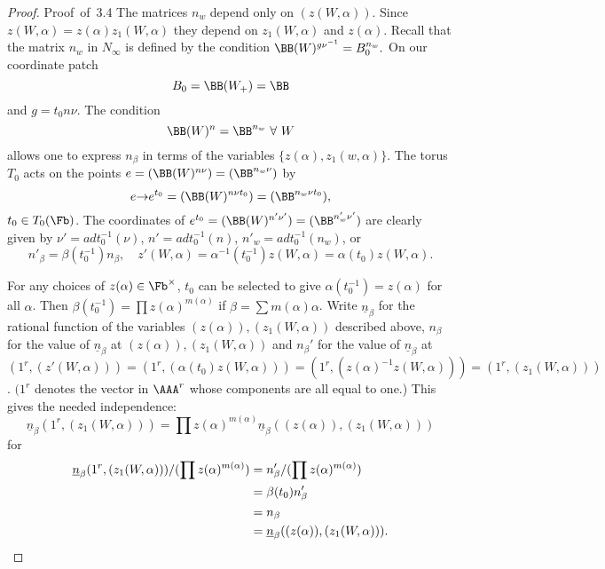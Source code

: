 \documentclass{memo-l}
\theoremstyle{definition}
\theoremstyle{remark}
\numberwithin{section}{chapter}
\numberwithin{equation}{chapter}
\begin{document}
\begin{proof} {Proof\ of\ 3.4}    The matrices $n_{w}$ depend only on $(z(W,{\alpha}))$. 
 Since $z(W,{\alpha}) = z({\alpha})z_{1}(W,{\alpha})$ they depend on 
$z_1(W,{\alpha})$ and $z({\alpha})$. 
 Recall that the matrix $n_{w}$ in $N_{{\infty}}$ is defined by the condition 
${\BB}(W)^{g\nu^{-1}} = B_{0}^{n_w}.$  
On our
coordinate patch $$B_{0} = {\BB}(W_{+})={\BB}$$ and $g = t_{0}n{\nu}$. 
 The condition $${\BB}(W)^n  = 
{\BB}^{n_w} \ \forall \ W$$ allows one to 
express $n_{{\beta}}$ in terms of the variables 
$\{z({\alpha}),z_{1}(w,\alpha)\}$.   The torus $T_{0}$ acts on the points 
$e = ({\BB}(W)^{n\nu}) = 
({\BB}^{n_w\nu})$ by $$e {\to} e^{t_0}  = ({\BB}(W)^{n\nu t_0}) = 
({\BB}^{n_w\nu t_0}),$$ $t_{0} \in T_{0}(\Fb)$. 
The coordinates of $e^{t_0}  = ({\BB}(W)^{n'{\nu}'}) = 
({\BB}^{n_{w}'{\nu}'})$ are clearly given by ${\nu}' = 
adt_0^{-1}({\nu})$, $n' = adt_0^{-1}(n)$, $n'_{w} = 
adt_0^{-1}(n_{w})$, or $$n'_{{\beta}} = {\beta}(t_0^{-1})n_{{\beta}},\quad 
z'(W,{\alpha}) = {\alpha}^{-1}(t_0^{-1})z(W,{\alpha}) = 
{\alpha}(t_0)z(W,{\alpha}).$$

   For any choices of $z({\alpha}) \in \Fb^{\times}$, $t_0$ can be selected 
to give ${\alpha}(t_0^{-1}) = z({\alpha})$ for all ${\alpha}$. 
 Then ${\beta}(t_0^{-1}) = \prod z({\alpha})^{m({\alpha})}$  if ${\beta} = 
\sum m({\alpha}){\alpha}$. 
 Write $\underline{n}_{{\beta}}$ for the rational function of the variables 
$(z({\alpha})),(z_1(W,{\alpha}))$ described above, $n_{{\beta}}$ for the 
value of $\underline{n}_{{\beta}}$ at $(z({\alpha})),(z_{1}(W,{\alpha}))$ and 
$n_{{\beta}}'$ for the value of $\underline{n} _{{\beta}}$ at 
$(1^r,(z'(W,{\alpha}))) = 
(1^r,({\alpha}(t_{0})z(W,{\alpha}))) = (1^r,
(z({\alpha})^{-1}z(W,{\alpha}))) = (1^r,(z_{1}(W,{\alpha})))$. 
 $(1^r$ denotes the vector in ${\AAA}^r$ whose components 
are all equal to one.)  This gives the needed independence:
$$
\underline{n}_{{\beta}}(1^r,(z_{1}(W,{\alpha}))) =
\prod z({\alpha})^{m({\alpha})}\underline{n}_{{\beta}}((z({\alpha})),
(z_{1}(W,{\alpha})))
$$
for 
$$
\aligned
\underline{n}_{{\beta}}(1^r,(z_{1}(W,{\alpha})))/(\prod 
z({\alpha})^{m({\alpha})}) &= n'_{{\beta}}/(\prod z({\alpha})^{m({\alpha})}) \\
&= {\beta}(t_0)n'_\beta \\ 
&= n_\beta \\
&= \underline{n}_{{\beta}}((z({\alpha})),(z_{1}(W,{\alpha}))).
\endaligned
$$



\end{proof}
\end{document}

